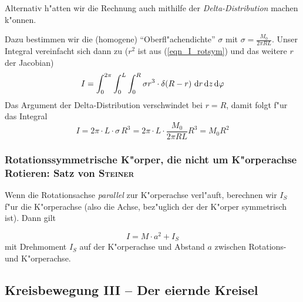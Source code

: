 Alternativ h"atten wir die Rechnung auch mithilfe der
\emph{Delta-Distribution} machen k"onnen.
\begin{Beispiel}
   Dazu bestimmen wir die (homogene) "`Oberfl"achendichte"' $\sigma$
   mit $\sigma = \frac{M_0}{2\pi R L}$. Unser Integral vereinfacht
   sich dann zu ($r^2$ ist aus (\ref{eqn_I_rotsym}) und das weitere
   $r$ der Jacobian)
   \begin{equation*}
      I = \int_0^{2\pi} \int_0^L  \int_0^R \sigma r^3 \cdot \delta(R - r)
       \, \, \mathrm{d} r \, \mathrm{d} z
      \, \mathrm{d} \varphi
   \end{equation*}
Das Argument der Delta-Distribution verschwindet bei $r = R$, damit
folgt f"ur das Integral
\begin{equation*}
   I = 2\pi \cdot L \cdot \sigma \, R^3 = 
2\pi \cdot L \cdot \frac{M_0}{2\pi R L} R^3 = 
M_0R^2
\end{equation*}
\end{Beispiel}




\subsubsection{Rotationssymmetrische K"orper, die nicht um K"orperachse Rotieren:
Satz von \textsc{Steiner}}
\label{kap_rotationssymmetrische-korper-nicht-um-korperachse}

Wenn die Rotationsachse \emph{parallel} zur K"orperachse verl"auft,
berechnen wir $I_S$ f"ur die K"orperachse (also die Achse, bez"uglich der
der K"orper symmetrisch ist). Dann gilt
\begin{Wichtig}
   \begin{equation}
      \label{eqn_satz_steiner}
      \boxed{ I = M \cdot a^2 + I_S }
   \end{equation}
mit Drehmoment $I_S$ auf der K"orperachse und Abstand $a$ zwischen
Rotations- und K"orperachse.
\end{Wichtig}













\subsection{Kreisbewegung III -- Der eiernde Kreisel}
\label{kap_kreisbewegung-iii-kreisel}


